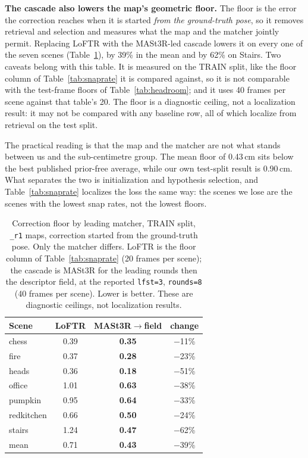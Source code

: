 \documentclass[journal]{IEEEtran}
\begin{document}
\textbf{The cascade also lowers the map's geometric floor.} The floor is the
error the correction reaches when it is started \emph{from the ground-truth
pose}, so it removes retrieval and selection and measures what the map and the
matcher jointly permit. Replacing LoFTR with the MASt3R-led cascade lowers it on
every one of the seven scenes (Table~\ref{tab:floorcascade}), by 39\% in the
mean and by 62\% on Stairs. Two caveats belong with this table. It is measured
on the TRAIN split, like the floor column of Table~\ref{tab:snaprate} it is
compared against, so it is not comparable with the test-frame floors of
Table~\ref{tab:headroom}; and it uses 40 frames per scene against that table's
20. The floor is a diagnostic ceiling, not a localization result: it may not be
compared with any baseline row, all of which localize from retrieval on the test
split.

The practical reading is that the map and the matcher are not what stands
between us and the sub-centimetre group. The mean floor of 0.43\,cm sits below
the best published prior-free average, while our own test-split result is
0.90\,cm. What separates the two is initialization and hypothesis selection, and
Table~\ref{tab:snaprate} localizes the loss the same way: the scenes we lose are
the scenes with the lowest snap rates, not the lowest floors.

\begin{table}[t]
\caption{Correction floor by leading matcher, TRAIN split, \texttt{\_r1} maps,
correction started from the ground-truth pose. Only the matcher differs. LoFTR
is the floor column of Table~\ref{tab:snaprate} (20 frames per scene); the
cascade is MASt3R for the leading rounds then the descriptor field, at the
reported \texttt{lfst=3}, \texttt{rounds=8} (40 frames per scene). Lower is
better. These are diagnostic ceilings, not localization results.}
\label{tab:floorcascade}
\centering\footnotesize
\setlength{\tabcolsep}{5pt}
\begin{tabular}{@{}lccc@{}}
\toprule
Scene & LoFTR & MASt3R$\to$field & change \\
\midrule
chess      & 0.39 & \textbf{0.35} & $-$11\% \\
fire       & 0.37 & \textbf{0.28} & $-$23\% \\
heads      & 0.36 & \textbf{0.18} & $-$51\% \\
office     & 1.01 & \textbf{0.63} & $-$38\% \\
pumpkin    & 0.95 & \textbf{0.64} & $-$33\% \\
redkitchen & 0.66 & \textbf{0.50} & $-$24\% \\
stairs     & 1.24 & \textbf{0.47} & $-$62\% \\
\midrule
mean       & 0.71 & \textbf{0.43} & $-$39\% \\
\bottomrule
\end{tabular}
\end{table}
\end{document}
